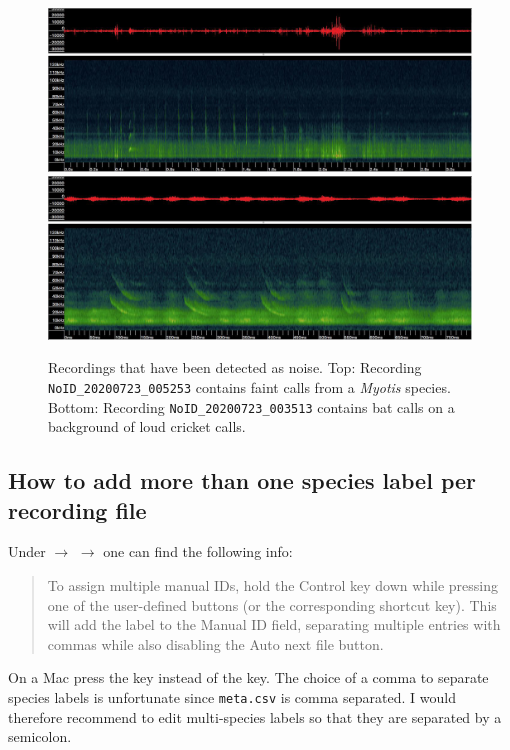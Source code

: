 \documentclass[English, 11pt, twoside, authoryear]{article}
\begin{document}
\begin{figure}[htbp]
\begin{center}
\includegraphics[width=.9\textwidth]{Fig/NoID_20200723_005253}\vspace{2em}
\includegraphics[width=.9\textwidth]{Fig/NoID_20200723_003513}
\caption{Recordings that have been detected as noise. Top: Recording \texttt{NoID\_20200723\_005253} contains faint calls from a \textit{Myotis} species. Bottom: Recording \texttt{NoID\_20200723\_003513} contains bat calls on a background of loud cricket calls.}
\label{NoID_20200723_005253}
\end{center}
\end{figure}

%
%
%
\subsection{How to add more than one species label per recording file}
%
%
%
Under  $\rightarrow$  $\rightarrow$  one can find the following info:

\begin{quote}
To assign multiple manual IDs, hold the Control key down while pressing one of the user-defined buttons (or the corresponding shortcut key). This will add the label to the Manual ID field, separating multiple entries with commas while also disabling the Auto next file button. 
\end{quote}

On a Mac press the  key instead of the  key. The choice of a comma to separate species labels is unfortunate since \texttt{meta.csv} is comma separated. I would therefore recommend to edit multi-species labels so that they are separated by a semicolon.
\end{document}
